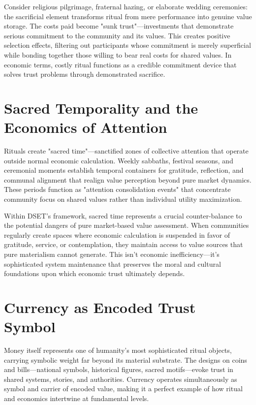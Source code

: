 \documentclass[11pt,oneside]{book}
\begin{document}
Consider religious pilgrimage, fraternal hazing, or elaborate wedding ceremonies: the sacrificial element transforms ritual from mere performance into genuine value storage. The costs paid become "sunk trust"—investments that demonstrate serious commitment to the community and its values. This creates positive selection effects, filtering out participants whose commitment is merely superficial while bonding together those willing to bear real costs for shared values. In economic terms, costly ritual functions as a credible commitment device that solves trust problems through demonstrated sacrifice.

\section{Sacred Temporality and the Economics of Attention}

Rituals create "sacred time"—sanctified zones of collective attention that operate outside normal economic calculation. Weekly sabbaths, festival seasons, and ceremonial moments establish temporal containers for gratitude, reflection, and communal alignment that realign value perception beyond pure market dynamics. These periods function as "attention consolidation events" that concentrate community focus on shared values rather than individual utility maximization.

Within DSET's framework, sacred time represents a crucial counter-balance to the potential dangers of pure market-based value assessment. When communities regularly create spaces where economic calculation is suspended in favor of gratitude, service, or contemplation, they maintain access to value sources that pure materialism cannot generate. This isn't economic inefficiency—it's sophisticated system maintenance that preserves the moral and cultural foundations upon which economic trust ultimately depends.

\section{Currency as Encoded Trust Symbol}

Money itself represents one of humanity's most sophisticated ritual objects, carrying symbolic weight far beyond its material substrate. The designs on coins and bills—national symbols, historical figures, sacred motifs—evoke trust in shared systems, stories, and authorities. Currency operates simultaneously as symbol and carrier of encoded value, making it a perfect example of how ritual and economics intertwine at fundamental levels.
\end{document}
